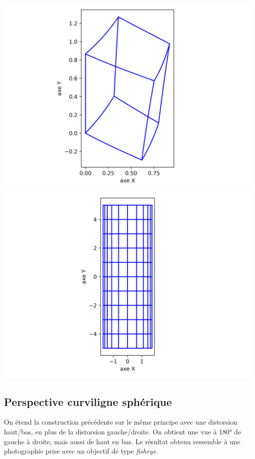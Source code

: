 \documentclass[11pt,class=report,crop=false]{standalone}
\begin{document}
\begin{center}
	\includegraphics[scale=\myscale,scale=0.5]{figures/cube_curviligne_cylindrique}
	\includegraphics[scale=\myscale,scale=0.5]{figures/grille_curviligne_cylindrique}
\end{center}


\subsection{Perspective curviligne sphérique}

On étend la construction précédente sur le même principe avec une distorsion haut/bas, en plus de la distorsion gauche/droite. On obtient une vue à \ang{180} de gauche à droite, mais aussi de haut en bas.
Le résultat obtenu ressemble à une photographie prise avec un objectif de type \emph{fisheye}.
\end{document}
